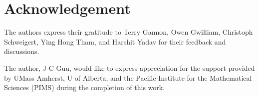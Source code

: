 \section*{Acknowledgement}

The authors express their gratitude to Terry Gannon, Owen Gwilliam, Christoph
Schweigert, Ying Hong Tham, and Harshit Yadav for their feedback and
discussions.

The author, J-C Guu, would like to express appreciation for the support
provided by UMass Amherst, U of Alberta, and the Pacific Institute for the
Mathematical Sciences (PIMS) during the completion of this work.
